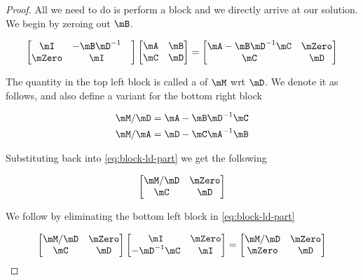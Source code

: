 \begin{proof}
  All we need to do is perform a block  and we
  directly arrive at our solution. We begin by zeroing out $\mB$.

  \begin{equation} \label{eq:block-ld-part}
    \begin{bmatrix} \mI & -\mB \mD^{-1} & \\ \mZero & \mI \end{bmatrix}
    \begin{bmatrix}\mA & \mB \\ \mC & \mD \end{bmatrix} =
    \begin{bmatrix} \mA - \mB \mD^{-1} \mC & \mZero \\ \mC & \mD \end{bmatrix}
  \end{equation}

  The quantity in the top left block is called a  of
  $\mM$ wrt $\mD$. We denote it as follows, and also define a variant for the
  bottom right block

  \begin{align}
    \mM/\mD &= \mA - \mB \mD^{-1} \mC \\
    \mM/\mA &= \mD - \mC \mA^{-1} \mB
  \end{align}

  Substituting back into \eqref{eq:block-ld-part} we get the following

  \begin{equation}
    \begin{bmatrix} \mM/\mD & \mZero \\ \mC & \mD \end{bmatrix}
  \end{equation}

  We follow by eliminating the bottom left block in \eqref{eq:block-ld-part}

  \begin{equation} \label{eq:block-du-part}
    \begin{bmatrix} \mM/\mD & \mZero \\ \mC & \mD \end{bmatrix}
    \begin{bmatrix} \mI & \mZero \\ -\mD^{-1} \mC & \mI \end{bmatrix} =
    \begin{bmatrix} \mM/\mD & \mZero \\ \mZero & \mD \end{bmatrix}
  \end{equation}


\end{proof}
